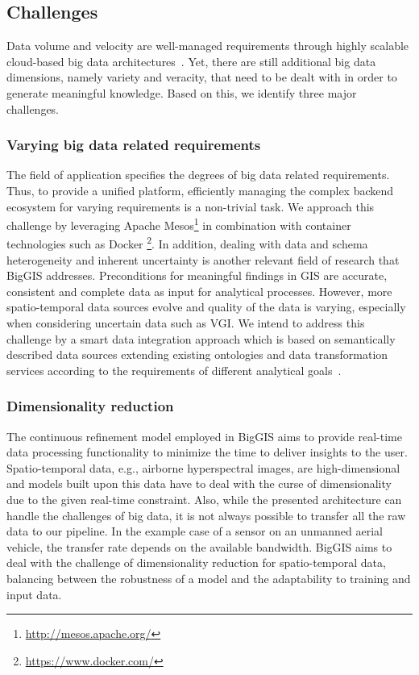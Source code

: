 \documentclass{sig-alternate-05-2015}
\begin{document}
\subsection{Challenges}
\label{sec:chls}
Data volume and velocity are well-managed requirements through highly
scalable cloud-based big data architectures~\cite{Marz2013, Kreps2014}.
Yet, there are still additional big data dimensions, namely variety and
veracity, that need to be dealt with in order to generate meaningful knowledge.
Based on this, we identify three major challenges.

\subsubsection{Varying big data related requirements}
The field of application specifies the degrees of big data related
requirements. Thus, to provide a unified platform, efficiently managing
the complex backend ecosystem for varying requirements is a non-trivial task.
We approach this challenge by leveraging Apache
Mesos\footnote{\url{http://mesos.apache.org/}} in combination with container
technologies such as Docker \footnote{\url{https://www.docker.com/}}. In
addition, dealing with data and schema heterogeneity and inherent uncertainty
is another relevant field of research that BigGIS addresses. Preconditions for
meaningful findings in GIS are accurate, consistent and complete data as input
for analytical processes. However, more spatio-temporal data sources evolve and
quality of the data is varying, especially when considering uncertain data such
as VGI. We intend to address this challenge by a smart data integration
approach which is based on semantically described data sources extending
existing ontologies and data transformation services according to the
requirements of different analytical goals~\cite{Frank.2016a, Frank.2016b}.

\subsubsection{Dimensionality reduction}
The continuous refinement model employed in BigGIS aims to provide real-time
data processing functionality to minimize the time to deliver insights to the
user. Spatio-temporal data, e.g., airborne hyperspectral images, are
high-dimensional and models built upon this data have to deal with the curse of
dimensionality due to the given real-time constraint. Also, while the presented
architecture can handle the challenges of big data, it is not always possible
to transfer all the raw data to our pipeline. In the example case of a sensor
on an unmanned aerial vehicle, the transfer rate depends on the available
bandwidth. BigGIS aims to deal with the challenge of dimensionality reduction
for spatio-temporal data, balancing between the robustness of a model and the
adaptability to training and input data. 
\end{document}

